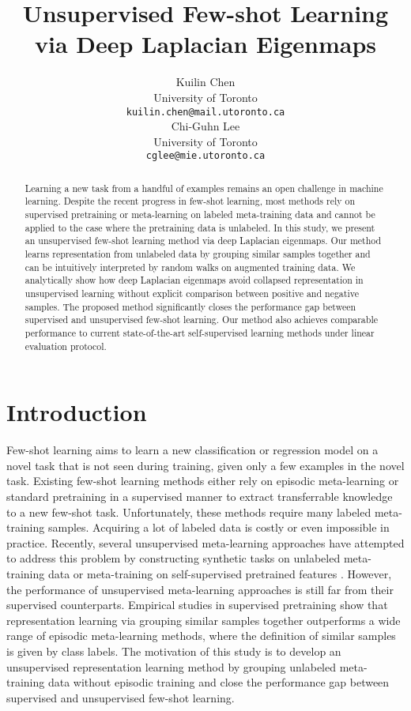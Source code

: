 \documentclass{article}
\title{Unsupervised Few-shot Learning via Deep Laplacian Eigenmaps}
\author{\large{Kuilin Chen} \\
	\large{University of Toronto}\\
	{\texttt{kuilin.chen@mail.utoronto.ca}} \\
	\And
	\large{Chi-Guhn Lee} \\
	\large{University of Toronto} \\
	{\texttt{cglee@mie.utoronto.ca}} \\
}
\renewcommand{\cite}{\citep}
\begin{document}
	
\maketitle
\begin{abstract}
	Learning a new task from a handful of examples remains an open challenge in machine learning. Despite the recent progress in few-shot learning,  most methods rely on supervised pretraining or meta-learning on labeled meta-training data and cannot be applied to the case where the pretraining data is unlabeled. In this study, we present an unsupervised few-shot learning method via deep Laplacian eigenmaps. Our method learns representation from unlabeled data by grouping similar samples together and can be intuitively interpreted by random walks on augmented training data. We analytically show how deep Laplacian eigenmaps avoid collapsed representation in unsupervised learning without explicit comparison between positive and negative samples. The proposed method significantly closes the performance gap between supervised and unsupervised few-shot learning. Our method also achieves comparable performance to current state-of-the-art self-supervised learning methods under linear evaluation protocol.
\end{abstract}

\section{Introduction}
Few-shot learning \citep{fei:etal:2006one} aims to learn a new classification or regression model on a novel task that is not seen during training, given only a few examples in the novel task. Existing few-shot learning methods either rely on episodic meta-learning \citep{finn:etal:2017,snell:etal:2017} or standard pretraining \citep{chen:etal:2019,tian:etal:2020rethinking} in a supervised manner to extract transferrable knowledge to a new few-shot task. Unfortunately, these methods require many labeled meta-training samples. Acquiring a lot of labeled data is costly or even impossible in practice. Recently, several unsupervised meta-learning approaches have attempted to address this problem by constructing synthetic tasks on unlabeled meta-training data \citep{hsu:etal:2019unsupervised,khodadadeh:etal:2019unsupervised,khodadadeh:etal:2021unsupervised} or meta-training on self-supervised pretrained features \cite{lee:etal:2021metagmvae}. However, the performance of unsupervised meta-learning approaches is still far from their supervised counterparts. Empirical studies in supervised pretraining show that representation learning via grouping similar samples together \citep{chen:etal:2019,tian:etal:2020rethinking,dhillon:etal:2020baseline,laenen:Bertinetto:2021} outperforms a wide range of episodic meta-learning methods, where the definition of similar samples is given by class labels. The motivation of this study is to develop an unsupervised representation learning method by grouping unlabeled meta-training data without episodic training and close the performance gap between supervised and unsupervised few-shot learning. 
\end{document}
